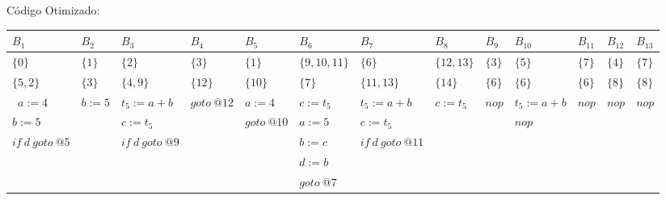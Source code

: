C\'odigo Otimizado:

\begin{table}[ht]
\begin{scriptsize}
\begin{tabular}{l|l|l|l|l|l|l|l|l|l|l|l|l}
$B_{1}$ & $B_{2}$ & $B_{3}$ & $B_{4}$ & $B_{5}$ & $B_{6}$ & $B_{7}$ & $B_{8}$ & $B_{9}$ & $B_{10}$ & $B_{11}$ & $B_{12}$ & $B_{13}$ \\
\hline
$\{0\}$ & $\{1\}$ & $\{2\}$ & $\{3\}$ & $\{1\}$ & $\{9, 10, 11\}$ & $\{6\}$ & $\{12, 13\}$ & $\{3\}$ & $\{5\}$ & $\{7\}$ & $\{4\}$ & $\{7\}$ \\
$\{5, 2\}$ & $\{3\}$ & $\{4, 9\}$ & $\{12\}$ & $\{10\}$ & $\{7\}$ & $\{11, 13\}$ & $\{14\}$ & $\{6\}$ & $\{6\}$ & $\{6\}$ & $\{8\}$ & $\{8\}$ \\
\hline\
$a:=4$ & $b:=5$ & $t_{5}:=a+b$ & $goto\:@12$ & $a:=4$ & $c:=t_{5}$ & $t_{5}:=a+b$ & $c:=t_{5}$ & $nop$ & $t_{5}:=a+b$ & $nop$ & $nop$ & $nop$ \\
$b:=5$ &  & $c:=t_{5}$ &  & $goto\:@10$ & $a:=5$ & $c:=t_{5}$ &  &  & $nop$ &  &  &  \\
$if\:d\:goto\:@5$ &  & $if\:d\:goto\:@9$ &  &  & $b:=c$ & $if\:d\:goto\:@11$ &  &  &  &  &  &  \\
 &  &  &  &  & $d:=b$ &  &  &  &  &  &  &  \\
 &  &  &  &  & $goto\:@7$ &  &  &  &  &  &  &  \\
\end{tabular}
\end{scriptsize}
\end{table}

